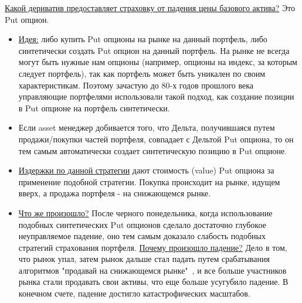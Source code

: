 \documentclass{article}
\begin{document}
\underline{Какой дериватив предоставляет страховку от падения цены базового актива?} Это Put опцион. 
\begin{itemize}
\item \underline{Идея:} либо купить Put опционы на рынке на данный портфель, либо синтетически создать Put опцион на данный портфель. На рынке не всегда могут быть нужные нам опционы (например, опционы на индекс, за которым следует портфель), так как портфель может быть уникален по своим характеристикам. Поэтому зачастую до 80-х годов прошлого века управляющие портфелями использовали такой подход, как создание позиции в Put опционе на портфель синтетически.
 
 
 \item Если asset менеджер добивается того, что Дельта, получившаяся путем продажи/покупки частей портфеля, совпадает с Дельтой Put опциона, то он тем самым автоматически создает синтетическую позицию в Put опционе.
 
 \item \underline{Издержки по данной стратегии} дают стоимость (value) Put опциона за применение подобной стратегии. Покупка происходит на рынке, идущем вверх, а продажа портфеля - на снижающемся рынке.
 
 \item \underline{Что же произошло?} После черного понедельника, когда использование подобных синтетических Put опционов сделало достаточно глубокое неуправляемое падение, оно тем самым доказало слабость подобных стратегий страхования портфеля. \underline{Почему произошло падение?} Дело в том, что рынок упал, затем рынок дальше стал падать путем срабатывания алгоритмов "продавай на снижающемся рынке"\ , и все больше участников рынка стали продавать свои активы, что еще больше усугубило падение. В конечном счете, падение достигло катастрофических масштабов.
 
\end{itemize}
\end{document}
